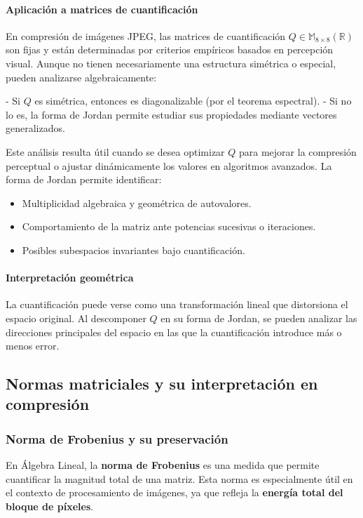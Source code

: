 \documentclass[8pt,a4paper]{article}
\theoremstyle{definition}
\theoremstyle{remark}
\begin{document}
\begin{multicols}{2}
            \paragraph{Aplicación a matrices de cuantificación}
            
            En compresión de imágenes JPEG, las matrices de cuantificación \( Q \in \mathbb{M}_{8 \times 8}(\mathbb{R}) \) son fijas y están determinadas por criterios empíricos basados en percepción visual. Aunque no tienen necesariamente una estructura simétrica o especial, pueden analizarse algebraicamente:
            
            - Si \( Q \) es simétrica, entonces es diagonalizable (por el teorema espectral).
            - Si no lo es, la forma de Jordan permite estudiar sus propiedades mediante vectores generalizados.
            
            Este análisis resulta útil cuando se desea optimizar \( Q \) para mejorar la compresión perceptual o ajustar dinámicamente los valores en algoritmos avanzados. La forma de Jordan permite identificar:
            
            \begin{itemize}
                \item Multiplicidad algebraica y geométrica de autovalores.
                \item Comportamiento de la matriz ante potencias sucesivas o iteraciones.
                \item Posibles subespacios invariantes bajo cuantificación.
            \end{itemize}
            
            \paragraph{Interpretación geométrica}
            La cuantificación puede verse como una transformación lineal que distorsiona el espacio original. Al descomponer \( Q \) en su forma de Jordan, se pueden analizar las direcciones principales del espacio en las que la cuantificación introduce más o menos error.

            \vspace{1em}


        \subsection{Normas matriciales y su interpretación en compresión}
            \subsubsection{Norma de Frobenius y su preservación}
            En Álgebra Lineal, la \textbf{norma de Frobenius} es una medida que permite cuantificar la magnitud total de una matriz. Esta norma es especialmente útil en el contexto de procesamiento de imágenes, ya que refleja la \textbf{energía total del bloque de píxeles}.
        

\end{multicols}
\end{document}
